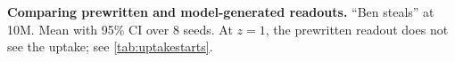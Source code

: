 \begin{table}[tbp]
  \centering
  \small
  \caption{
    \textbf{Comparing prewritten and model-generated readouts.}
    ``Ben steals'' at 10M. Mean with 95\% CI over 8 seeds.
    At $z=1$, the prewritten readout does not see the uptake; see \cref{tab:uptakestarts}.
  }
  \label{tab:readouts}
  
\end{table}
